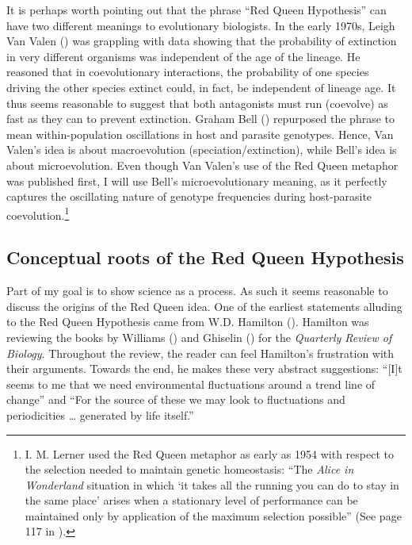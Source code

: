 \documentclass[
  american,
  letterpaper,
]{book}
\begin{document}
It is perhaps worth pointing out that the phrase ``Red Queen
Hypothesis'' can have two different meanings to evolutionary biologists.
In the early 1970s, Leigh Van Valen ()
was grappling with data showing that the probability of extinction in
very different organisms was independent of the age of the lineage. He
reasoned that in coevolutionary interactions, the probability of one
species driving the other species extinct could, in fact, be independent
of lineage age. It thus seems reasonable to suggest that both
antagonists must run (coevolve) as fast as they can to prevent
extinction. Graham Bell () repurposed the
phrase to mean within-population oscillations in host and parasite
genotypes. Hence, Van Valen's idea is about macroevolution
(speciation/extinction), while Bell's idea is about microevolution. Even
though Van Valen's use of the Red Queen metaphor was published first, I
will use Bell's microevolutionary meaning, as it perfectly captures the
oscillating nature of genotype frequencies during host-parasite
coevolution.\footnote{I. M. Lerner used the Red Queen metaphor as early
  as 1954 with respect to the selection needed to maintain genetic
  homeostasis: ``The \emph{Alice in Wonderland} situation in which `it
  takes all the running you can do to stay in the same place' arises
  when a stationary level of performance can be maintained only by
  application of the maximum selection possible'' (See page 117 in
  ).}

\subsection{Conceptual roots of the Red Queen
Hypothesis}\label{conceptual-roots-of-the-red-queen-hypothesis}

Part of my goal is to show science as a process. As such it seems
reasonable to discuss the origins of the Red Queen idea. One of the
earliest statements alluding to the Red Queen Hypothesis came from W.D.
Hamilton (). Hamilton was reviewing
the books by Williams () and Ghiselin
() for the \emph{Quarterly Review of
Biology}. Throughout the review, the reader can feel Hamilton's
frustration with their arguments. Towards the end, he makes these very
abstract suggestions: ``{[}I{]}t seems to me that we need environmental
fluctuations around a trend line of change'' and ``For the source of
these we may look to fluctuations and periodicities \ldots{} generated
by life itself.''
\end{document}
